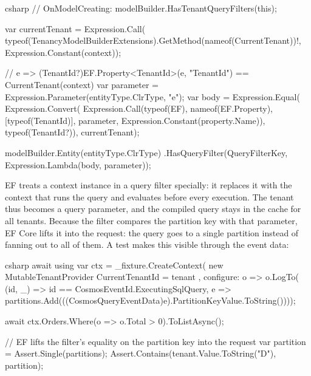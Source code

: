 \begin{sourcecode}{csharp}
// OnModelCreating: modelBuilder.HasTenantQueryFilters(this);

var currentTenant = Expression.Call(
    typeof(TenancyModelBuilderExtensions).GetMethod(nameof(CurrentTenant))!,
    Expression.Constant(context));

// e => (TenantId?)EF.Property<TenantId>(e, "TenantId") == CurrentTenant(context)
var parameter = Expression.Parameter(entityType.ClrType, "e");
var body = Expression.Equal(
    Expression.Convert(
        Expression.Call(typeof(EF), nameof(EF.Property), [typeof(TenantId)],
            parameter, Expression.Constant(property.Name)),
        typeof(TenantId?)),
    currentTenant);

modelBuilder.Entity(entityType.ClrType)
    .HasQueryFilter(QueryFilterKey, Expression.Lambda(body, parameter));
\end{sourcecode}

EF treats a context instance in a query filter specially: it replaces it with the context that
runs the query and evaluates  before
every execution. The tenant thus becomes a query parameter, and the compiled query stays in the
cache for all tenants. Because the filter compares the partition key with that parameter, EF
Core lifts it into the request: the query goes to a single partition instead of fanning out
to all of them. A test makes this visible through the event data:

\begin{sourcecode}{csharp}
await using var ctx = _fixture.CreateContext(
    new MutableTenantProvider { CurrentTenantId = tenant },
    configure: o => o.LogTo(
        (id, _) => id == CosmosEventId.ExecutingSqlQuery,
        e => partitions.Add(((CosmosQueryEventData)e).PartitionKeyValue.ToString())));

await ctx.Orders.Where(o => o.Total > 0).ToListAsync();

// EF lifts the filter's equality on the partition key into the request
var partition = Assert.Single(partitions);
Assert.Contains(tenant.Value.ToString("D"), partition);
\end{sourcecode}

